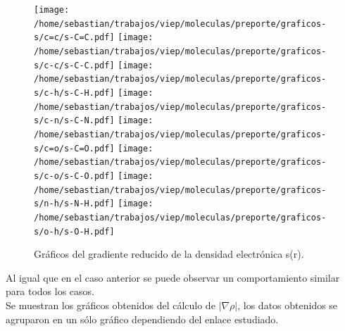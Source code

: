 \documentclass[12pt,letterpaper]{article}
\begin{document}
\begin{figure}[H]
\begin{center}
\texttt{[image: /home/sebastian/trabajos/viep/moleculas/preporte/graficos-s/c=c/s-C=C.pdf]}
\texttt{[image: /home/sebastian/trabajos/viep/moleculas/preporte/graficos-s/c-c/s-C-C.pdf]}
\texttt{[image: /home/sebastian/trabajos/viep/moleculas/preporte/graficos-s/c-h/s-C-H.pdf]}
\texttt{[image: /home/sebastian/trabajos/viep/moleculas/preporte/graficos-s/c-n/s-C-N.pdf]}
\texttt{[image: /home/sebastian/trabajos/viep/moleculas/preporte/graficos-s/c=o/s-C=O.pdf]}
\texttt{[image: /home/sebastian/trabajos/viep/moleculas/preporte/graficos-s/c-o/s-C-O.pdf]}
\texttt{[image: /home/sebastian/trabajos/viep/moleculas/preporte/graficos-s/n-h/s-N-H.pdf]}
\texttt{[image: /home/sebastian/trabajos/viep/moleculas/preporte/graficos-s/o-h/s-O-H.pdf]}
\end{center}
\caption{Gráficos del gradiente reducido de la densidad electrónica s(r).}
\end{figure}
Al igual que en el caso anterior se puede observar un comportamiento similar para todos los casos.\\
Se muestran los gráficos obtenidos del cálculo de $|\nabla\rho|$, los datos obtenidos se agruparon en un sólo gráfico dependiendo del enlace estudiado.\\
\end{document}
